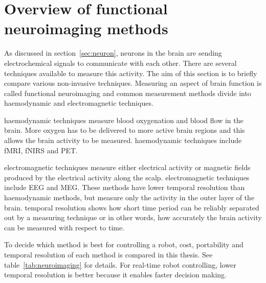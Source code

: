 \section{Overview of functional neuroimaging methods}
\label{sec:neuroimaging}

As discussed in section~\ref{sec:neuron}, \glspl{neuron} in the brain are sending electrochemical signals to communicate with each other. There are several techniques available to measure this activity. The aim of this section is to briefly compare various non-invasive techniques. Measuring an aspect of brain function is called \gls{functional neuroimaging} and common measurement methods divide into \gls{haemodynamic} and \gls{electromagnetic} techniques.

\Gls{haemodynamic} techniques measure blood oxygenation and blood flow in the brain. More oxygen has to be delivered to more active brain regions and this allows the brain activity to be measured. \Gls{haemodynamic} techniques include \gls{fMRI}, \gls{fNIRS} and \gls{PET}.

\Gls{electromagnetic} techniques measure either electrical activity or magnetic fields produced by the electrical activity along the scalp. \Gls{electromagnetic} techniques include \gls{EEG} and \gls{MEG}. These methods have lower \gls{temporal resolution} than \gls{haemodynamic} methods, but measure only the activity in the outer layer of the brain. \Gls{temporal resolution} shows how short time period can be reliably separated out by a measuring technique or in other words, how accurately the brain activity can be measured with respect to time.

To decide which method is best for controlling a robot, cost, portability and \gls{temporal resolution} of each method is compared in this thesis. See table~\ref{tab:neuroimaging} for details. For real-time robot controlling, lower \gls{temporal resolution} is better because it enables faster decision making.


\newcommand{\pMEG}{\tablefootnote{http://neurogadget.com/2012/12/15/inexpensive-magnetoencephalography-meg-system-could-be-available-at-every-hospital/6495}}
\newcommand{\pfMRI}{\tablefootnote{http://info.blockimaging.com/bid/92623/MRI-Machine-Cost-and-Price-Guide}}
\newcommand{\pPET}{\tablefootnote{http://info.blockimaging.com/bid/68875/How-Much-Does-a-PET-CT-Scanner-Cost}}
\newcommand{\pEEG}{\tablefootnote{http://en.wikipedia.org/wiki/Comparison\_of\_consumer\_brain-computer\_interfaces}}
\newcommand{\pNIRS}{\cite{NIRS}}
\newcommand{\tresol}{\cite{timeresol}}

